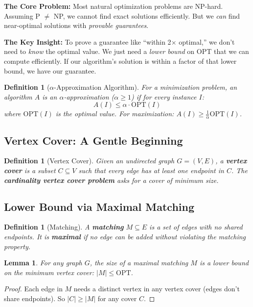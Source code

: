 \documentclass[11pt,oneside]{book}
\newtheorem{lemma}[theorem]{Lemma}
\newtheorem{definition}[theorem]{Definition}
\newcommand{\OPT}{\mathrm{OPT}}
\begin{document}
\begin{intuitionbox}
\textbf{The Core Problem:} Most natural optimization problems are NP-hard. Assuming P $\neq$ NP, we cannot find exact solutions efficiently. But we \emph{can} find near-optimal solutions with \emph{provable guarantees}.

\textbf{The Key Insight:} To prove a guarantee like ``within 2$\times$ optimal,'' we don't need to \emph{know} the optimal value. We just need a \emph{lower bound} on OPT that we can compute efficiently. If our algorithm's solution is within a factor of that lower bound, we have our guarantee.
\end{intuitionbox}

\begin{definition}[$\alpha$-Approximation Algorithm]
For a minimization problem, an algorithm $A$ is an $\alpha$-approximation ($\alpha \geq 1$) if for every instance $I$:
\[
A(I) \leq \alpha \cdot \OPT(I)
\]
where $\OPT(I)$ is the optimal value. For maximization: $A(I) \geq \frac{1}{\alpha}\OPT(I)$.
\end{definition}

\subsection{Vertex Cover: A Gentle Beginning}

\begin{definition}[Vertex Cover]
Given an undirected graph $G = (V, E)$, a \textbf{vertex cover} is a subset $C \subseteq V$ such that every edge has at least one endpoint in $C$. The \textbf{cardinality vertex cover problem} asks for a cover of minimum size.
\end{definition}

\subsection{Lower Bound via Maximal Matching}

\begin{definition}[Matching]
A \textbf{matching} $M \subseteq E$ is a set of edges with no shared endpoints. It is \textbf{maximal} if no edge can be added without violating the matching property.
\end{definition}

\begin{lemma}
For any graph $G$, the size of a maximal matching $M$ is a lower bound on the minimum vertex cover: $|M| \leq \OPT$.
\end{lemma}
\begin{proof}
Each edge in $M$ needs a distinct vertex in any vertex cover (edges don't share endpoints). So $|C| \geq |M|$ for any cover $C$.
\end{proof}
\end{document}
